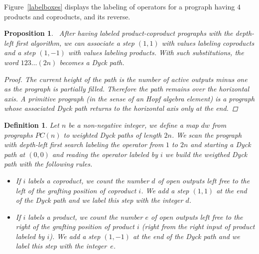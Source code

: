 \documentclass{amsart}
\newtheorem{proposition}[theorem]{Proposition}
\newtheorem{definition}[theorem]{Definition}
\begin{document}
Figure~\ref{labelboxes} displays the labeling of operators for a
prograph having $4$ products and coproducts, and its reverse.


\begin{proposition}~\label{progtodyck}
  After having labeled product-coproduct prographs with the depth-left first
  algorithm, we can associate a step $(1,1)$ with values labeling
  coproducts and a step $(1,-1)$ with values labeling products. With such
  substitutions, the word $123\dots(2n)$ becomes a Dyck path.
  \begin{proof}
    The current height of the path is the number of active outputs
    minus one as the prograph is partially filled. Therefore the
    path remains over the horizontal axis. A primitive prograph (in
    the sense of an Hopf algebra element) is a prograph whose
    associated Dyck path returns to the horizontal axis only at the end.
  \end{proof}
\end{proposition}


\begin{definition}
  Let $n$ be a non-negative integer, we define a map $dw$ from
  prographs $PC(n)$ to weighted Dyck paths of length $2n$. We scan
  the prograph with depth-left first search labeling the operator from
  $1$ to $2n$ and starting a Dyck path at $(0,0)$ and reading the operator labeled
  by $i$ we build the weigthed Dyck path with the following rules.
  \begin{itemize}
  \item If $i$ labels a coproduct, we count the number $d$ of open
    outputs left free to the left of the grafting position of coproduct
    $i$. We add a step $(1,1)$ at the end of the Dyck path and we
    label this step with the integer $d$.
  \item If $i$ labels a product, we count the number $e$ of open
    outputs left free to the right of the grafting position of
    product $i$ (right from the right input of product labeled by
    $i$). We add a step $(1,-1)$ at the end of the Dyck path and we
    label this step with the integer~$e$.
  \end{itemize}
\end{definition}

\end{document}
